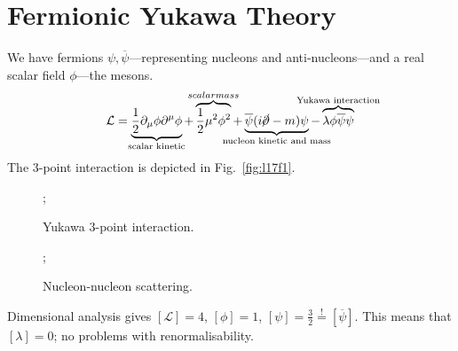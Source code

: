 \section{Fermionic Yukawa Theory}%
\label{sec:fermionic_yukawa_theory}

We have fermions $\psi, \overline{\psi}$---representing nucleons and anti-nucleons---and a real scalar field $\phi$---the mesons.
\begin{equation}
  \mathcal{L} = \underbrace{\frac{1}{2} \partial_{\mu} \phi \partial^{\mu} \phi}_{\mathclap{\text{scalar kinetic}}} + \overbrace{\frac{1}{2} \mu^2 \phi^2}^{\mathclap{scalar mass}} + \underbrace{\overline{\psi}(i \cancel{\partial} - m) \psi}_{\mathclap{\text{nucleon kinetic and mass}}} - \overbrace{\lambda \phi \overline{\psi} \psi}^{\mathclap{\text{Yukawa interaction}}}
\end{equation}
The $3$-point interaction is depicted in Fig.~\ref{fig:l17f1}.
\begin{figure}
  \begin{minipage}[t]{0.5\columnwidth}
    \centering
    ;
    \caption{Yukawa $3$-point interaction.}
    \label{fig:l17f1}
  \end{minipage}%
  \begin{minipage}[t]{0.5\columnwidth}
    \centering
    ;
    \caption{Nucleon-nucleon scattering.}
    \label{fig:l17f2}
  \end{minipage}
\end{figure}

Dimensional analysis gives $[\mathcal{L}] = 4$, $[\phi] = 1$, $[\psi] = \frac{3}{2} \stackrel{!}{=} \left[\overline{\psi}\right]$. This means that $[\lambda] = 0$; no problems with renormalisability.

